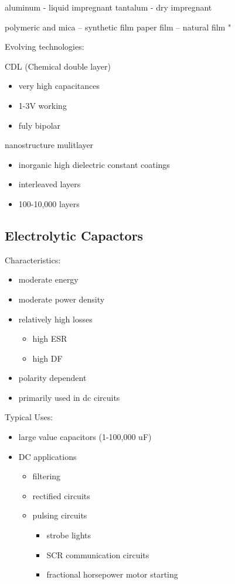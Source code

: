 aluminum - liquid impregnant
tantalum - dry impregnant

polymeric and mica -- synthetic film
paper film         -- natural film
"
\cite{capRev}

Evolving technologies:

CDL (Chemical double layer)
\begin{itemize}
    \item very high capacitances
    \item 1-3V working
    \item fuly bipolar
\end{itemize}

nanostructure mulitlayer
\begin{itemize}
    \item inorganic high dielectric constant coatings
    \item interleaved layers
    \item 100-10,000 layers
\end{itemize}
\cite{capRev}

\subsection{Electrolytic Capactors}

Characteristics:
\begin{itemize}
    \item moderate energy
    \item moderate power density
    \item relatively high losses
    \begin{itemize}
        \item high ESR
        \item high DF
    \end{itemize}
    \item polarity dependent
    \item primarily used in dc circuits
\end{itemize}

Typical Uses:
\begin{itemize}
    \item large value capacitors (1-100,000 uF)
    \item DC applications
    \begin{itemize}
        \item filtering
        \item rectified circuits
        \item pulsing circuits
        \begin{itemize}
            \item strobe lights
            \item SCR communication circuits
            \item fractional horsepower motor starting
        \end{itemize}
    \end{itemize}
\end{itemize}
\cite{capRev}


